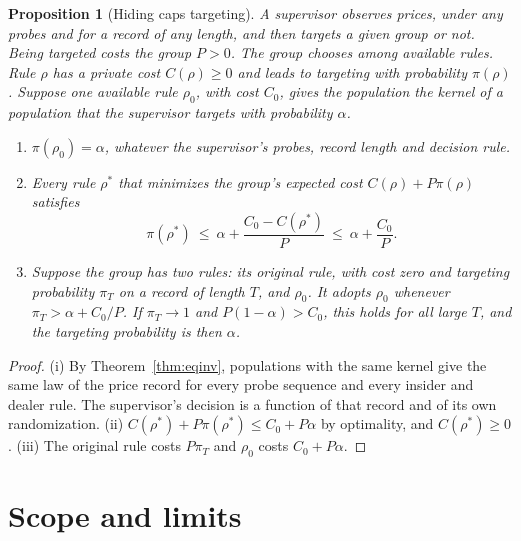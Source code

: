 \documentclass[12pt]{article}
\newtheorem{proposition}[theorem]{Proposition}
\theoremstyle{definition}
\theoremstyle{remark}
\begin{document}
\begin{proposition}[Hiding caps targeting]\label{prop:hiding}
A supervisor observes prices, under any probes and for a record of any length, and then targets a given group or not. Being targeted costs the group $P>0$. The group chooses among available rules. Rule $\rho$ has a private cost $C(\rho)\ge0$ and leads to targeting with probability $\pi(\rho)$. Suppose one available rule $\rho_0$, with cost $C_0$, gives the population the kernel of a population that the supervisor targets with probability $\alpha$.
\begin{enumerate}[label=(\roman*),itemsep=1pt]
\item $\pi(\rho_0)=\alpha$, whatever the supervisor's probes, record length and decision rule.
\item Every rule $\rho^*$ that minimizes the group's expected cost $C(\rho)+P\pi(\rho)$ satisfies
\[
\pi(\rho^*)\ \le\ \alpha+\frac{C_0-C(\rho^*)}{P}\ \le\ \alpha+\frac{C_0}{P}.
\]
\item Suppose the group has two rules: its original rule, with cost zero and targeting probability $\pi_T$ on a record of length $T$, and $\rho_0$. It adopts $\rho_0$ whenever $\pi_T>\alpha+C_0/P$. If $\pi_T\to1$ and $P(1-\alpha)>C_0$, this holds for all large $T$, and the targeting probability is then $\alpha$.
\end{enumerate}
\end{proposition}

\begin{proof}
(i) By Theorem~\ref{thm:eqinv}, populations with the same kernel give the same law of the price record for every probe sequence and every insider and dealer rule. The supervisor's decision is a function of that record and of its own randomization. (ii) $C(\rho^*)+P\pi(\rho^*)\le C_0+P\alpha$ by optimality, and $C(\rho^*)\ge0$. (iii) The original rule costs $P\pi_T$ and $\rho_0$ costs $C_0+P\alpha$.
\end{proof}


\section{Scope and limits}\label{sec:scope}
\end{document}
